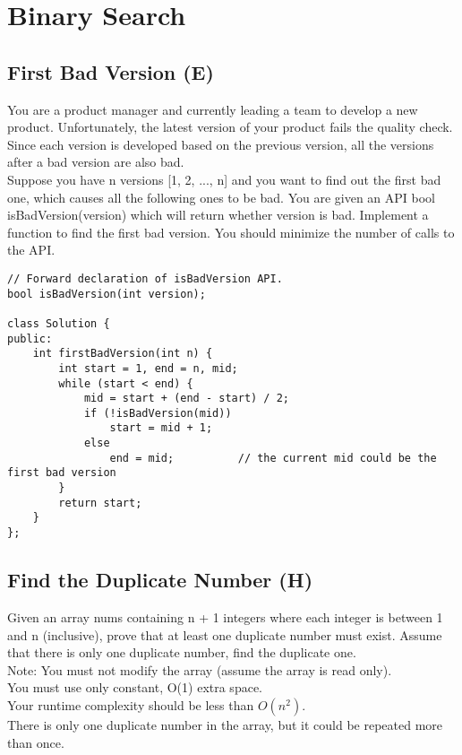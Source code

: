 \chapter{Binary Search}
\section{First Bad Version (E)}
You are a product manager and currently leading a team to develop a new product. Unfortunately, the latest version of your product fails the quality check. Since each version is developed based on the previous version, all the versions after a bad version are also bad.\\

Suppose you have n versions [1, 2, ..., n] and you want to find out the first bad one, which causes all the following ones to be bad. You are given an API bool isBadVersion(version) which will return whether version is bad. Implement a function to find the first bad version. You should minimize the number of calls to the API. \\

\begin{lstlisting}
// Forward declaration of isBadVersion API.
bool isBadVersion(int version);

class Solution {
public:
    int firstBadVersion(int n) {
        int start = 1, end = n, mid;
        while (start < end) {
            mid = start + (end - start) / 2;
            if (!isBadVersion(mid))
                start = mid + 1;
            else
                end = mid;          // the current mid could be the first bad version
        }
        return start;
    }
};
\end{lstlisting}


\section{Find the Duplicate Number (H)}
Given an array nums containing n + 1 integers where each integer is between 1 and n (inclusive), prove that at least one duplicate number must exist. Assume that there is only one duplicate number, find the duplicate one. \\

Note:
    You must not modify the array (assume the array is read only).\\
    You must use only constant, O(1) extra space.\\
    Your runtime complexity should be less than $O(n^2)$.\\
    There is only one duplicate number in the array, but it could be repeated more than once.\\

